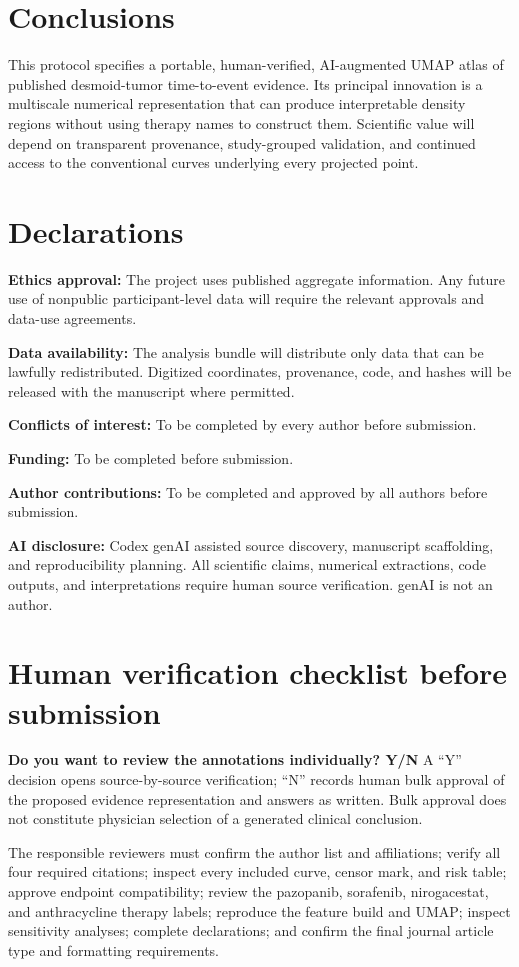 \documentclass[17pt]{extarticle}
\begin{document}
\section{Conclusions}

This protocol specifies a portable, human-verified, AI-augmented UMAP atlas of published desmoid-tumor time-to-event evidence. Its principal innovation is a multiscale numerical representation that can produce interpretable density regions without using therapy names to construct them. Scientific value will depend on transparent provenance, study-grouped validation, and continued access to the conventional curves underlying every projected point.

\section*{Declarations}

\textbf{Ethics approval:} The project uses published aggregate information. Any future use of nonpublic participant-level data will require the relevant approvals and data-use agreements.

\textbf{Data availability:} The analysis bundle will distribute only data that can be lawfully redistributed. Digitized coordinates, provenance, code, and hashes will be released with the manuscript where permitted.

\textbf{Conflicts of interest:} To be completed by every author before submission.

\textbf{Funding:} To be completed before submission.

\textbf{Author contributions:} To be completed and approved by all authors before submission.

\textbf{AI disclosure:} Codex genAI assisted source discovery, manuscript scaffolding, and reproducibility planning. All scientific claims, numerical extractions, code outputs, and interpretations require human source verification. genAI is not an author.

\section*{Human verification checklist before submission}

\textbf{Do you want to review the annotations individually? Y/N} A ``Y'' decision opens source-by-source verification; ``N'' records human bulk approval of the proposed evidence representation and answers as written. Bulk approval does not constitute physician selection of a generated clinical conclusion.

The responsible reviewers must confirm the author list and affiliations; verify all four required citations; inspect every included curve, censor mark, and risk table; approve endpoint compatibility; review the pazopanib, sorafenib, nirogacestat, and anthracycline therapy labels; reproduce the feature build and UMAP; inspect sensitivity analyses; complete declarations; and confirm the final journal article type and formatting requirements.



\end{document}
